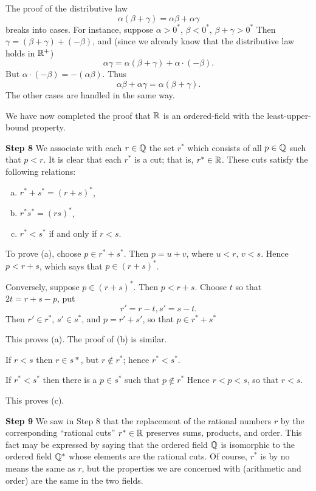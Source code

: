 The proof of the distributive law
\begin{equation*}
    \alpha(\beta + \gamma) = \alpha\beta + \alpha\gamma
\end{equation*}
breaks into cases. 
For instance, suppose $\alpha> 0^*$, $\beta <0^*$, $\beta + \gamma > 0^*$ 
Then $\gamma = (\beta + \gamma) + (- \beta)$, 
and (since we already know that the distributive law holds in ${\protect\mathbb R}^+$)
\begin{equation*}
    \alpha\gamma = \alpha(\beta+\gamma) + \alpha \cdot (-\beta).
\end{equation*}
But $\alpha \cdot (-\beta) = -(\alpha\beta)$. Thus
\begin{equation*}
    \alpha\beta + \alpha\gamma = \alpha(\beta + \gamma).
\end{equation*}
The other cases are handled in the same way.

We have now completed the proof that 
${\protect\mathbb R}$ is an ordered-field with the least-upper-bound property.

\textbf{Step 8} 
We associate with each $r\in {\protect\mathbb Q}$ the set $r^*$ 
which consists of all $p \in {\protect\mathbb Q}$ such that $p < r$. 
It is clear that each $r^*$ is a cut; 
that is, $r^* \in {\protect\mathbb R}$. 
These cuts satisfy the following relations:
\begin{enumerate}[(a)]
    \item $r^* + s^* = (r+s)^*$,
    \item $r^* s^* = (rs)^*$,
    \item $r^* < s^*$ if and only if $r < s$.
\end{enumerate}

To prove (a), choose $p \in r^* + s^*$. Then $p=u+v$, where $u<r$, $v<s$.
Hence $p < r +s$, which says that $p \in (r + s)^*$.

Conversely, suppose $p \in (r+s)^*$. Then $p < r + s$. Choose $t$ so that
$2t = r + s - p$, put
\begin{equation*}
    r' = r - t, 
    s' = s - t.
\end{equation*}
Then $r' \in r^*$, $s' \in s^*$, and $p = r' + s'$, so that $p \in r^* + s^*$

This proves (a). The proof of (b) is similar.

If $r < s$ then $r \in s*$, but $r \not\in r^*$; 
hence $r^* < s^*$.

If $r^* <s^*$ then there is a $p \in s^*$ 
such that $p \not\in r^*$ 
Hence $r < p < s$, so that $r < s$.

This proves (c).

\textbf{Step 9} 
We saw in Step 8 that the replacement of the rational numbers $r$ 
by the corresponding ``rational cuts'' $r^* \in {\protect\mathbb R}$ preserves sums, products, and order. 
This fact may be expressed by saying that 
the ordered field ${\protect\mathbb Q}$ is isomorphic to the ordered field ${\protect\mathbb Q}^*$ 
whose elements are the rational cuts. 
Of course, $r^*$ is by no means the same as $r$, 
but the properties we are concerned with (arithmetic and order) are the same in the two fields.

